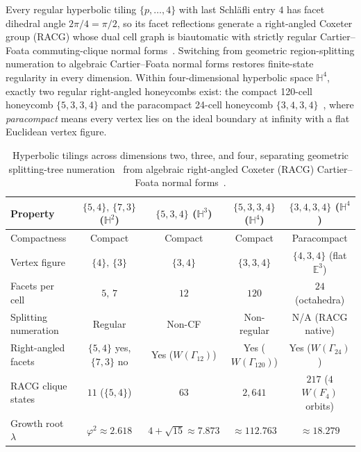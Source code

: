 Every regular hyperbolic tiling $\{p,\dots,4\}$ with last Schl\"afli entry $4$ has facet dihedral angle $2\pi/4 = \pi/2$, so its facet reflections generate a right-angled Coxeter group (RACG) whose dual cell graph is biautomatic with strictly regular Cartier--Foata commuting-clique normal forms~\cite{cartier1969,brink1993,davis2008racg}. Switching from geometric region-splitting numeration to algebraic Cartier--Foata normal forms restores finite-state regularity in every dimension. Within four-dimensional hyperbolic space $\mathbb{H}^4$, exactly two regular right-angled honeycombs exist: the compact 120-cell honeycomb $\{5,3,3,4\}$ and the paracompact 24-cell honeycomb $\{3,4,3,4\}$~\cite{coxeter1956,coxeter1973}, where \emph{paracompact} means every vertex lies on the ideal boundary at infinity with a flat Euclidean vertex figure.

\begin{table}[tb]
\centering
\caption{Hyperbolic tilings across dimensions two, three, and four, separating geometric splitting-tree numeration~\cite{margenstern2003skordev,margenstern2004fourd,margenstern2007vol1,margenstern2016coords} from algebraic right-angled Coxeter (RACG) Cartier--Foata normal forms~\cite{cartier1969,davis2008racg}.}
\label{tab:tiling-overview}
\small
\begin{tabular}{@{}lcccc@{}}
\toprule
Property & $\{5,4\},\,\{7,3\}$ ($\mathbb{H}^2$) & $\{5,3,4\}$ ($\mathbb{H}^3$) & $\{5,3,3,4\}$ ($\mathbb{H}^4$) & $\{3,4,3,4\}$ ($\mathbb{H}^4$) \\
\midrule
Compactness & Compact & Compact & Compact & Paracompact \\
Vertex figure & $\{4\},\,\{3\}$ & $\{3,4\}$ & $\{3,3,4\}$ & $\{4,3,4\}$ (flat $\mathbb{E}^3$) \\
Facets per cell & $5,\,7$ & $12$ & $120$ & $24$ (octahedra) \\
Splitting numeration & Regular & Non-CF & Non-regular & N/A (RACG native) \\
Right-angled facets & $\{5,4\}$ yes, $\{7,3\}$ no & Yes ($W(\Gamma_{12})$) & Yes ($W(\Gamma_{120})$) & Yes ($W(\Gamma_{24})$) \\
RACG clique states & $11$ ($\{5,4\}$) & $63$ & $2{,}641$ & $217$ ($4$ $W(F_4)$ orbits) \\
Growth root $\lambda$ & $\varphi^2 \approx 2.618$ & $4+\sqrt{15} \approx 7.873$ & $\approx 112.763$ & $\approx 18.279$ \\
\bottomrule
\end{tabular}
\end{table}

